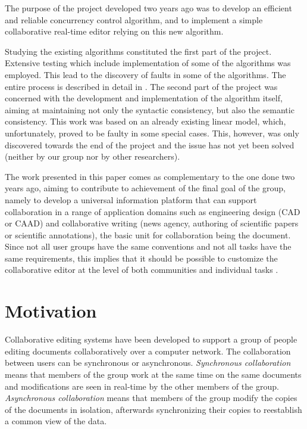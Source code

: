 The purpose of the project developed two years ago was to develop an efficient and reliable
concurrency control algorithm, and to implement a simple collaborative real-time editor relying
on this new algorithm.

Studying the existing algorithms constituted the first part of the project. Extensive testing which
include implementation of some of the algorithms was employed. This lead to the discovery of faults
in some of the algorithms. The entire process is described in detail in \cite{ned02}. The second
part of the project was concerned with the development and implementation of the algorithm itself,
aiming at maintaining not only the syntactic consistency, but also the semantic consistency. This
work was based on an already existing linear model, which, unfortunately, proved to be faulty in
some special cases. This, however, was only discovered towards the end of the project and the issue
has not yet been solved (neither by our group nor by other researchers).

The work presented in this paper comes as complementary to the one done two years ago, aiming to
contribute to achievement of the final goal of the group, namely to develop a universal information
platform that can support collaboration in a range of application domains such as engineering design
(CAD or CAAD) and collaborative writing (news agency, authoring of scientific papers or scientific
annotations), the basic unit for collaboration being the document. Since not all user groups have the
same conventions and not all tasks have the same requirements, this implies that it should be
possible to customize the collaborative editor at the level of both communities and individual
tasks \cite{ignat04b}.

\section{Motivation}

Collaborative editing systems have been developed to support a group of people editing documents
collaboratively over a computer network. The collaboration between users can be synchronous or
asynchronous. \emph{Synchronous collaboration} means that members of the group work at the same
time on the same documents and modifications are seen in real-time by the other members of the
group. \emph{Asynchronous collaboration} means that members of the group modify the copies of
the documents in isolation, afterwards synchronizing their copies to reestablish a common view
of the data.

